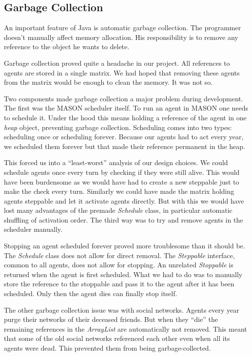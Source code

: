 \documentclass[runningheads,a4paper]{article}
\begin{document}
\subsection{Garbage Collection}

An important feature of Java is automatic garbage collection.
The programmer doesn't manually affect memory allocation. 
His responsibility is to remove any reference to the object he wants to delete.

Garbage collection proved quite a headache in our project.
All references to agents are stored in a single matrix.
We had hoped that removing these agents from the matrix would be enough to clean the memory.
It was not so.

Two components made garbage collection a major problem during development.
The first was the MASON scheduler itself.
To run an agent in MASON one needs to schedule it.
Under the hood this means holding a reference of the agent in one \textit{heap} object, preventing garbage collection.
Scheduling comes into two types: scheduling once or scheduling forever.
Because our agents had to act every year, we scheduled them forever but that made their reference permanent in the heap.

This forced us into a ``least-worst'' analysis of our design choices.
We could schedule agents once every turn by checking if they were still alive.
This would have been burdensome as we would have had to create a new steppable just to make the check every turn.
Similarly we could have made the matrix holding agents steppable and let it activate agents directly.
But with this we would have lost many advantages of the premade \textit{Schedule} class, in particular automatic shuffling of activation order.
The third way was to try and remove agents in the scheduler manually.

Stopping an agent scheduled forever proved more troublesome than it should be.
The \textit{Schedule} class does not allow for direct removal. 
The \textit{Steppable} interface, common to all agents, does not allow for stopping.
An unrelated \textit{Stoppable} is returned when the agent is first scheduled.
What we had to do was to manually store the reference to the stoppable and pass it to the agent after it has been scheduled.
Only then the agent dies can finally stop itself.

The other garbage collection issue was with social networks.
Agents every year purge their networks of their deceased friends. 
But when they ``die'' the remaining references in the \textit{ArrayList} are automatically not removed.
This meant that some of the old social networks referenced each other even when all its agents were dead.
This prevented them from being garbage-collected.
\end{document}
